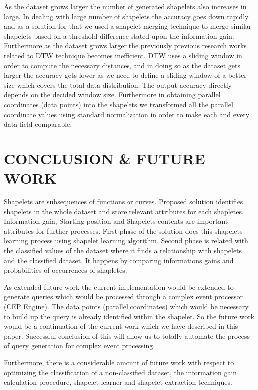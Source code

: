 \documentclass[letterpaper, 10 pt, conference]{IEEEtran}  %
\begin{document}
 
As the dataset grows larger the number of generated shapelets also increases in large. In dealing with large number of shapelets the accuracy goes down rapidly and as a solution for that we used a shapelet merging technique to merge similar shapelets based on a threshold difference stated upon the information gain. Furthermore as the dataset grows larger the previously previous research works related to DTW technique becomes inefficient. DTW uses a sliding window in order to compute the necessary distances, and in doing so as the dataset gets larger the accuracy gets lower as we need to define a sliding window of a better size which covers the total data distribution. The output accuracy directly depends on the decided window size.
Furthermore in obtaining parallel coordinates (data points) into the shapelets we transformed all the parallel coordinate values using standard normalization in order to make each and every data field comparable.


\section{CONCLUSION \& FUTURE WORK}

Shapelets are subsequences of functions or curves. Proposed solution identifies shapelets in the whole dataset and store relevant attributes for each shapletes. Information gain, Starting position and Shapelets contents are important attributes for further processes. First phase of the solution does this shapelets learning process using shapelet learning algorithm. Second phase is related with the classified values of the dataset where it finds a relationship with shapelets and the classified dataset. It happens by comparing informations gains and probabilities of occurrences of shapletes.  

As extended future work the current implementation would be extended to generate queries which would be processed through a complex event processor (CEP Engine). The data points (parallel coordinates) which would be necessary to build up the query is already identified within the shapelet. So the future work would be a continuation of the current work which we have described in this paper. Successful conclusion of this will allow us to totally automate the process of query generation for complex event processing. 

Furthermore, there is a considerable amount of future work with respect to optimizing the classification of a non-classified dataset, the information gain calculation procedure, shapelet learner and shapelet extraction techniques. 
 
\end{document}
